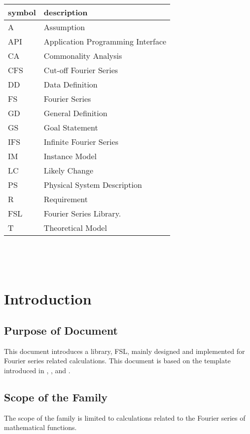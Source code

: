 \documentclass[12pt]{article}
\newcommand{\famname}{FSL} %
\begin{document}
\renewcommand{\arraystretch}{1.2}
\begin{tabular}{l l} 
  \toprule		
  \textbf{symbol} & \textbf{description}\\
  \midrule 
  A & Assumption\\
  API & Application Programming Interface\\
  CA & Commonality Analysis\\
  CFS & Cut-off Fourier Series\\
  DD & Data Definition\\
  FS & Fourier Series\\
  GD & General Definition\\
  GS & Goal Statement\\
  IFS & Infinite Fourier Series\\
  IM & Instance Model\\
  LC & Likely Change\\
  PS & Physical System Description\\
  R & Requirement\\
  \famname{} & Fourier Series Library.\\
  T & Theoretical Model\\
  \bottomrule
\end{tabular}\\


\newpage

\tableofcontents

~\newpage


\section{Introduction}

\subsection{Purpose of Document}
This document introduces a library, \famname, mainly designed and implemented 
for Fourier series related calculations. This document is based on the 
template introduced in \cite{Smith2006}, \cite{SmithAndLai2005}, 
and \cite{SmithMcCutchanAndCarette2017}.

\subsection{Scope of the Family} 
The scope of the family is limited to calculations related to the Fourier 
series of mathematical functions.
\end{document}
